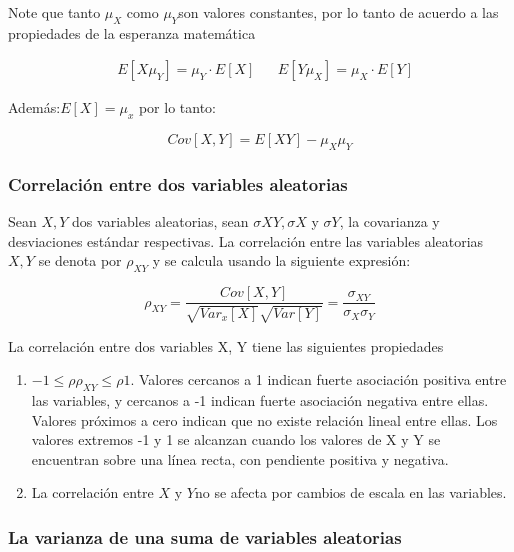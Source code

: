 Note que tanto $\mu_X$ como $\mu_Y $son valores constantes, por lo tanto de
acuerdo a las propiedades de la esperanza matemática

\begin{align*}
     & E\left[X\mu_Y\right]=\mu_Y\cdot E\left[X\right] &  & E\left[ Y \mu_X\right]=\mu_X\cdot E\left[Y\right]
\end{align*}

Además:$E\left[X\right]=\mu_x$ por lo tanto:

\begin{equation}
    Cov\left[ X,Y\right]=E\left[ XY\right]-\mu_X\mu_Y
\end{equation}


\subsubsection{Correlación entre dos variables aleatorias}

Sean $X,Y$ dos variables aleatorias, sean $\sigma XY, \sigma X$ y $\sigma Y$, la covarianza y desviaciones estándar respectivas. La correlación entre las variables aleatorias $X,Y$ se denota por $\rho_{XY}$ y se calcula usando la siguiente expresión:

\begin{equation}
    \rho_{XY}=\frac{Cov \left[X ,Y\right]}{\sqrt{Var_x\left[X\right]} \sqrt{Var\left[Y\right]}}=\frac{\sigma_{XY}}{\sigma_X \sigma_Y}
\end{equation}

La correlación entre dos variables X, Y tiene las siguientes propiedades

\begin{enumerate}
    \item $-1\leq \rho \rho_{XY}\leq \rho 1$. Valores cercanos a 1 indican fuerte asociación positiva entre las variables, y cercanos a -1 indican fuerte asociación negativa entre ellas. Valores próximos a cero indican que no existe relación lineal entre ellas. Los valores extremos -1 y 1 se alcanzan cuando los valores de X y Y se encuentran sobre una línea recta, con pendiente positiva y negativa.
    \item La correlación entre $X$ y $Y $no se afecta por cambios de escala en las variables.
\end{enumerate}

\subsubsection{La varianza de una suma de variables aleatorias}

